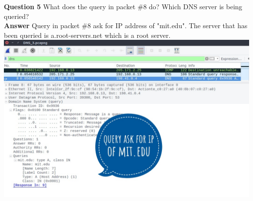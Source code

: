 \documentclass[14pt]{extarticle}
\begin{document}
    \noindent
    \textbf{\large Question 5}
    What does the query in packet \#8 do? Which DNS server is being queried?\\[10pt]
    \textbf{\large Answer}
    Query in packet \#8 ask for IP address of "mit.edu". The server that has been queried is a.root-servers.net which is a root server.\\[10pt]
    \includegraphics[scale=0.45]{3_5_1}\\[10pt]
    \vspace{1cm}
\end{document}
